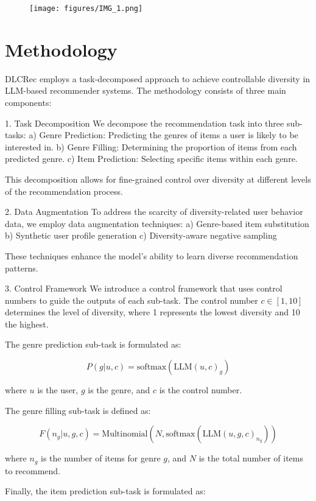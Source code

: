 \documentclass[12pt,letterpaper]{article}
\begin{document}
\begin{figure}[h!]
	\centering
  \texttt{[image: figures/IMG\_1.png]}
  \caption{}
  \label{fig:Geometry}
\end{figure}

\section{Methodology}

DLCRec employs a task-decomposed approach to achieve controllable diversity in LLM-based recommender systems. The methodology consists of three main components:

1. Task Decomposition
We decompose the recommendation task into three sub-tasks:
a) Genre Prediction: Predicting the genres of items a user is likely to be interested in.
b) Genre Filling: Determining the proportion of items from each predicted genre.
c) Item Prediction: Selecting specific items within each genre.

This decomposition allows for fine-grained control over diversity at different levels of the recommendation process.

2. Data Augmentation
To address the scarcity of diversity-related user behavior data, we employ data augmentation techniques:
a) Genre-based item substitution
b) Synthetic user profile generation
c) Diversity-aware negative sampling

These techniques enhance the model's ability to learn diverse recommendation patterns.

3. Control Framework
We introduce a control framework that uses control numbers to guide the outputs of each sub-task. The control number \(c \in [1, 10]\) determines the level of diversity, where 1 represents the lowest diversity and 10 the highest.

The genre prediction sub-task is formulated as:

\[P(g|u, c) = \text{softmax}(\text{LLM}(u, c)_g)\]

where \(u\) is the user, \(g\) is the genre, and \(c\) is the control number.

The genre filling sub-task is defined as:

\[F(n_g|u, g, c) = \text{Multinomial}(N, \text{softmax}(\text{LLM}(u, g, c)_{n_g}))\]

where \(n_g\) is the number of items for genre \(g\), and \(N\) is the total number of items to recommend.

Finally, the item prediction sub-task is formulated as:
\end{document}
